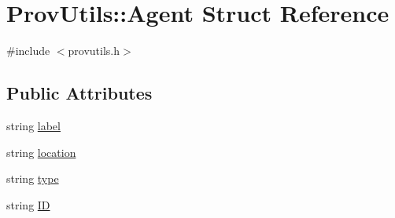 \hypertarget{struct_prov_utils_1_1_agent}{\section{Prov\-Utils\-:\-:Agent Struct Reference}
\label{struct_prov_utils_1_1_agent}
}


{\ttfamily \#include $<$provutils.\-h$>$}

\subsection*{Public Attributes}
\begin{DoxyCompactItemize}
\item 
string \hyperlink{struct_prov_utils_1_1_agent_a3a9574d1061f33684ff8fb85d5a9ed60}{label}
\item 
string \hyperlink{struct_prov_utils_1_1_agent_a950c27a3d264ecb209fbb09151a86148}{location}
\item 
string \hyperlink{struct_prov_utils_1_1_agent_a1afa29b1a7cc51f53535d392a09914ac}{type}
\item 
string \hyperlink{struct_prov_utils_1_1_agent_a306ec064cb69d3a6ac4fc0cf77c10b53}{I\-D}
\end{DoxyCompactItemize}



